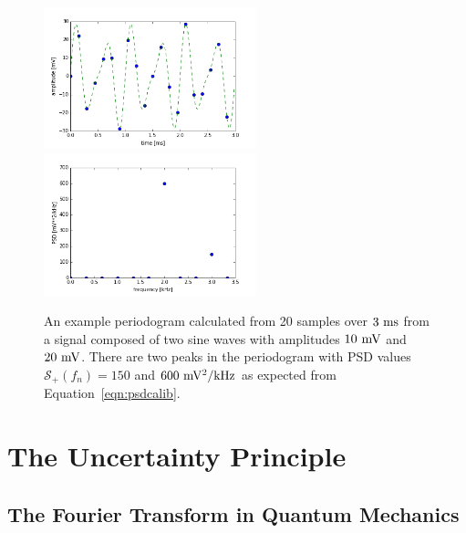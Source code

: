 \documentclass[12pt,oneside]{book}
\begin{document}
\begin{figure}[thb]
\begin{center}
{\includegraphics[width=0.55\textwidth]{figs/periodogram_ts.png}}\\
{\includegraphics[width=0.55\textwidth]{figs/periodogram_eg.png}}
\end{center}
\caption{\label{fig:periodogram}  An example periodogram calculated from 20 samples over $3~\rm ms$ from a signal composed of two sine waves with amplitudes $10~\rm mV$ and $20~\rm mV$.  There are two peaks in the periodogram with PSD values $\mathcal{S}_{+}(f_n) = 150$ and $600~{\rm mV^2} / {\rm kHz}$ as expected from Equation~\ref{eqn:psdcalib}.
}
\end{figure}

\chapter{The Uncertainty Principle}
\section{The Fourier Transform in Quantum Mechanics}
\end{document}
